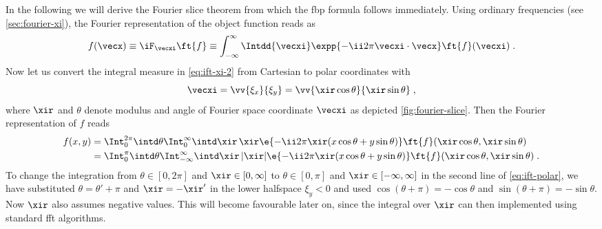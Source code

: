 \documentclass[
twoside,
openright,
titlepage,
numbers=noenddot,
headinclude,
fleqn,
a4paper,
footinclude=true,
cleardoublepage=empty,
abstractoff,
BCOR=5mm,
paper=a4,
fontsize=11pt,
british,ngerman,american,
]{scrreprt}
\begin{document}
In the following we will derive the Fourier slice theorem from which
the \ac{fbp} formula follows immediately.  Using ordinary frequencies
(see \cref{sec:fourier-xi}), the Fourier representation of the object
function reads as
\begin{equation}
  \label{eq:ift-xi-2}
  f(\vecx) \equiv \iF_{\vecxi}\ft{f} \equiv
  \int_{-\infty}^\infty \Intdd{\vecxi}
  \expp{-\ii 2\pi\vecxi\cdot\vecx} \ft{f}(\vecxi) \;.
\end{equation}
Now let us convert the integral measure in \cref{eq:ift-xi-2} from
Cartesian to polar coordinates with
\begin{equation}
  \label{eq:polar}
  \vecxi = \vv{\xi_x}{\xi_y} = 
  \vv{\xir \cos\theta}{\xir \sin\theta} \;,
\end{equation}
where $\xir$ and $\theta$ denote modulus and angle of Fourier space
coordinate $\vecxi$ as depicted \cref{fig:fourier-slice}.  Then the
Fourier representation of $f$ reads
\begin{equation}
  \label{eq:ift-polar}
  \begin{split}
    f(x,y) & = \Int_0^{2\pi} \intd \theta \Int_0^\infty \intd
    \xir\,\xir \e{-\ii 2\pi\xir( x\cos\theta + y\sin\theta)}
    \ft{f}(\xir\cos\theta,\xir\sin\theta)
    \\ & = \Int_0^{\pi} \intd \theta \Int_{-\infty}^\infty \intd
    \xir\,|\xir| \e{-\ii 2\pi\xir( x\cos\theta + y\sin\theta)}
    \ft{f}(\xir\cos\theta,\xir\sin\theta) \;.
  \end{split}
\end{equation}
To change the integration from $\theta\in[0,2\pi]$ and
$\xir\in[0,\infty]$ to $\theta\in[0,\pi]$ and
$\xir\in[-\infty,\infty]$ in the second line of \cref{eq:ift-polar},
we have substituted $\theta=\theta'+\pi$ and $\xir=-\xir'$ in the
lower half\hyph space $\xi_y<0$ and used
$\cos(\theta+\pi)=-\cos\theta$ and $\sin(\theta+\pi)=-\sin\theta$.
Now $\xir$ also assumes negative values.  This will become favourable
later on, since the integral over $\xir$ can then implemented using
standard \ac{fft} algorithms.
\end{document}
